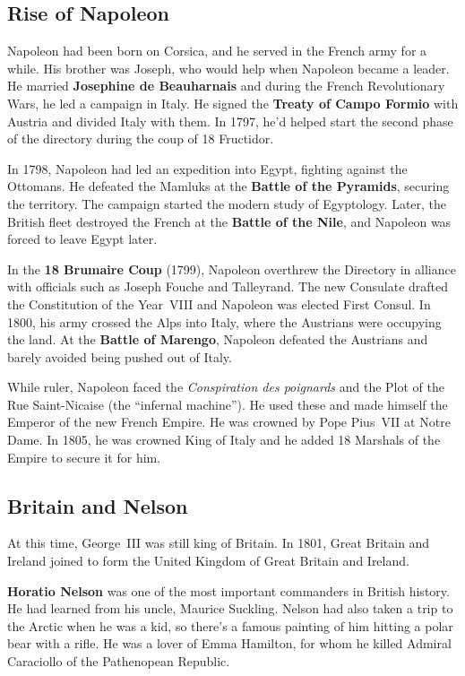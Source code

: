 \subsection*{Rise of Napoleon}

Napoleon had been born on Corsica, and he served in the French army for a while.
His brother was Joseph, who would help when Napoleon became a leader.
He married \textbf{Josephine de Beauharnais} and during the French Revolutionary Wars,
he led a campaign in Italy.
He signed the \textbf{Treaty of Campo Formio} with Austria and divided Italy with them.
In 1797, he'd helped start the second phase of the directory during the coup of 18 Fructidor.

In 1798, Napoleon had led an expedition into Egypt, fighting against the Ottomans.
He defeated the Mamluks at the \textbf{Battle of the Pyramids}, securing the territory.
The campaign started the modern study of Egyptology.
Later, the British fleet destroyed the French at the \textbf{Battle of the Nile},
and Napoleon was forced to leave Egypt later.

In the \textbf{18 Brumaire Coup} (1799),
Napoleon overthrew the Directory in alliance with officials such as Joseph Fouche and Talleyrand.
The new Consulate drafted the Constitution of the Year~VIII and Napoleon was elected First Consul.
In 1800, his army crossed the Alps into Italy, where the Austrians were occupying the land.
At the \textbf{Battle of Marengo},
Napoleon defeated the Austrians and barely avoided being pushed out of Italy.

While ruler, Napoleon faced the \textit{Conspiration des poignards}
and the Plot of the Rue Saint-Nicaise (the ``infernal machine'').
He used these and made himself the Emperor of the new French Empire.
He was crowned by Pope Pius~VII at Notre Dame.
In 1805, he was crowned King of Italy and he added 18 Marshals of the Empire to secure it for him.

\subsection*{Britain and Nelson}

At this time, George~III was still king of Britain.
In 1801, Great Britain and Ireland joined to form the United Kingdom of Great Britain and Ireland.

\textbf{Horatio Nelson} was one of the most important commanders in British history.
He had learned from his uncle, Maurice Suckling.
Nelson had also taken a trip to the Arctic when he was a kid,
so there's a famous painting of him hitting a polar bear with a rifle.
He was a lover of Emma Hamilton, for whom he killed Admiral Caraciollo of the Pathenopean Republic.

